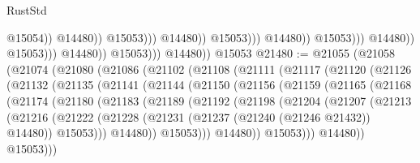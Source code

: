 \begin{lexlean}{RustStd}
\begin{coremodule}
                                                              @15054))
                                                          @14480))
                                                      @15053)))
                                                @14480))
                                            @15053)))
                                      @14480))
                                  @15053)))
                            @14480))
                        @15053)))
                  @14480))
              @15053)))
        @14480))
    @15053
@21480 := @21055
    (@21058
      (@21074
        (@21080
          (@21086
            (@21102
              (@21108
                (@21111
                  (@21117
                    (@21120
                      (@21126
                        (@21132
                          (@21135
                            (@21141
                              (@21144
                                (@21150
                                  (@21156
                                    (@21159
                                      (@21165
                                        (@21168
                                          (@21174
                                            (@21180
                                              (@21183
                                                (@21189
                                                  (@21192
                                                    (@21198
                                                      (@21204
                                                        (@21207
                                                          (@21213
                                                            (@21216
                                                              (@21222
                                                                (@21228
                                                                  (@21231
                                                                    (@21237
                                                                      (@21240 (@21246 @21432))
                                                                      @14480))
                                                                  @15053)))
                                                            @14480))
                                                        @15053)))
                                                  @14480))
                                              @15053)))
                                        @14480))
                                    @15053)))

\end{coremodule}
\end{lexlean}
